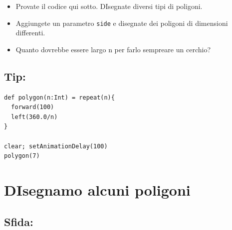 \begin{itemize}

\item {Provate il codice qui sotto. DIsegnate diversi tipi di poligoni.}
\item {Aggiungete un parametro \lstinline{side} e disegnate dei poligoni di dimensioni differenti.}
\item {Quanto dovrebbe essere largo n per farlo sempreare un cerchio?}

\end{itemize}


\section*{\color{OliveGreen}Tip:}

\begin{lstlisting}[basicstyle={\ttfamily\fontsize{18}{22}\selectfont},numbers=none]
def polygon(n:Int) = repeat(n){
  forward(100)
  left(360.0/n)
}

clear; setAnimationDelay(100)
polygon(7)
\end{lstlisting}
        

  
\chapter{DIsegnamo alcuni poligoni}\section*{\color{BrickRed}Sfida:}


